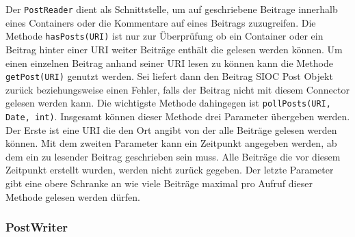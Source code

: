 Der \texttt{PostReader} dient als Schnittstelle, um auf geschriebene Beitrage innerhalb eines Containers oder die Kommentare auf eines Beitrags zuzugreifen. Die Methode \texttt{hasPosts(URI)} ist nur zur Überprüfung ob ein Container oder ein Beitrag hinter einer URI weiter Beiträge enthält die gelesen werden können. Um einen einzelnen Beitrag anhand seiner URI lesen zu können kann die Methode \texttt{getPost(URI)}  genutzt werden. Sei liefert dann den Beitrag SIOC Post Objekt zurück beziehungsweise einen Fehler, falls der Beitrag nicht mit diesem Connector gelesen werden kann. Die wichtigste Methode dahingegen ist \texttt{pollPosts(URI, Date, int)}. Insgesamt können dieser Methode drei Parameter übergeben werden. Der Erste ist eine URI die den Ort angibt von der alle Beiträge gelesen werden können. Mit dem zweiten Parameter kann ein Zeitpunkt angegeben werden, ab dem ein zu lesender Beitrag geschrieben sein muss. Alle Beiträge die vor diesem Zeitpunkt erstellt wurden, werden nicht zurück gegeben. Der letzte Parameter gibt eine obere Schranke an wie viele Beiträge maximal pro Aufruf dieser Methode gelesen werden dürfen.


\subsubsection{PostWriter} %
\label{ssub:postwriter}

